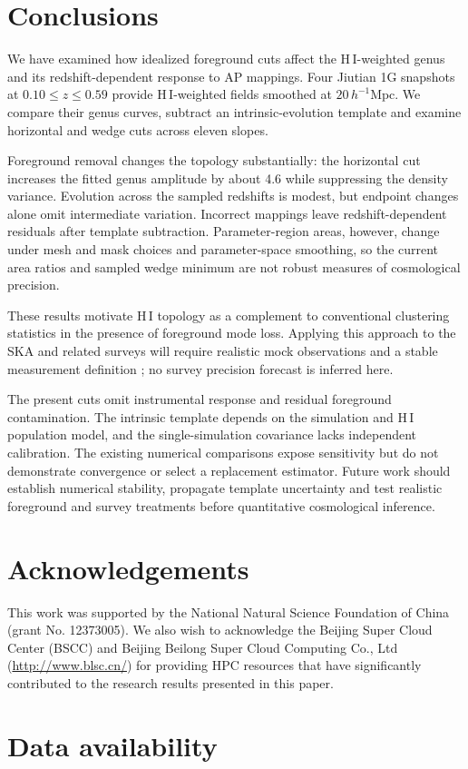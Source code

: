 \section{Conclusions}\label{sec:conclusion}
We have examined how idealized foreground cuts affect the H\,I-weighted genus and its redshift-dependent response to AP mappings. Four Jiutian 1G snapshots at $0.10\le z\le0.59$ provide H\,I-weighted fields smoothed at $20\,h^{-1}\mathrm{Mpc}$. We compare their genus curves, subtract an intrinsic-evolution template and examine horizontal and wedge cuts across eleven slopes.

Foreground removal changes the topology substantially: the horizontal cut increases the fitted genus amplitude by about 4.6 while suppressing the density variance. Evolution across the sampled redshifts is modest, but endpoint changes alone omit intermediate variation. Incorrect mappings leave redshift-dependent residuals after template subtraction. Parameter-region areas, however, change under mesh and mask choices and parameter-space smoothing, so the current area ratios and sampled wedge minimum are not robust measures of cosmological precision.

These results motivate H\,I topology as a complement to conventional clustering statistics in the presence of foreground mode loss. Applying this approach to the SKA and related surveys will require realistic mock observations and a stable measurement definition \citep{Wang2015HITopologySKA}; no survey precision forecast is inferred here.

The present cuts omit instrumental response and residual foreground contamination. The intrinsic template depends on the simulation and H\,I population model, and the single-simulation covariance lacks independent calibration. The existing numerical comparisons expose sensitivity but do not demonstrate convergence or select a replacement estimator. Future work should establish numerical stability, propagate template uncertainty and test realistic foreground and survey treatments before quantitative cosmological inference.

\section*{Acknowledgements}
This work was supported by the National Natural Science Foundation of China (grant No. 12373005). We also wish to acknowledge the Beijing Super Cloud Center (BSCC) and Beijing Beilong Super Cloud Computing Co., Ltd (\url{http://www.blsc.cn/}) for providing HPC resources that have significantly contributed to the research results presented in this paper.

\section*{Data availability}
